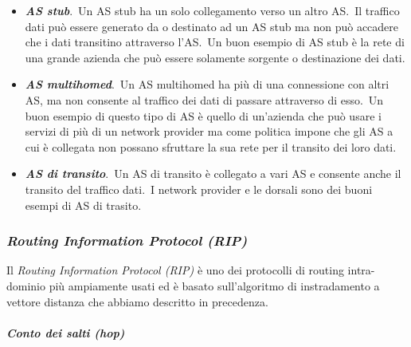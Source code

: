 \begin{itemize}
    \item \textbf{\emph{AS stub}}.\
          Un AS stub ha un solo collegamento verso un altro AS.\
          Il traffico dati può essere generato da o destinato ad un AS stub ma non può accadere che i dati transitino attraverso l'AS.\
          Un buon esempio di AS stub è la rete di una grande azienda che può essere solamente sorgente o destinazione dei dati.
    \item \textbf{\emph{AS multihomed}}.\
          Un AS multihomed ha più di una connessione con altri AS, ma non consente al traffico dei dati di passare attraverso di esso.\
          Un buon esempio di questo tipo di AS è quello di un'azienda che può usare i servizi di più di un network provider ma come politica impone che gli AS a cui è collegata non possano sfruttare la sua rete per il transito dei loro dati.
    \item \textbf{\emph{AS di transito}}.\
          Un AS di transito è collegato a vari AS e consente anche il transito del traffico dati.\
          I network provider e le dorsali sono dei buoni esempi di AS di trasito.
\end{itemize}

\subsubsection{\emph{Routing Information Protocol (RIP)}}

Il \emph{Routing Information Protocol (RIP)} è uno dei protocolli di routing intra-dominio più ampiamente usati ed è basato sull'algoritmo di instradamento a vettore distanza che abbiamo descritto in precedenza.

\paragraph{\emph{Conto dei salti (hop)}}

